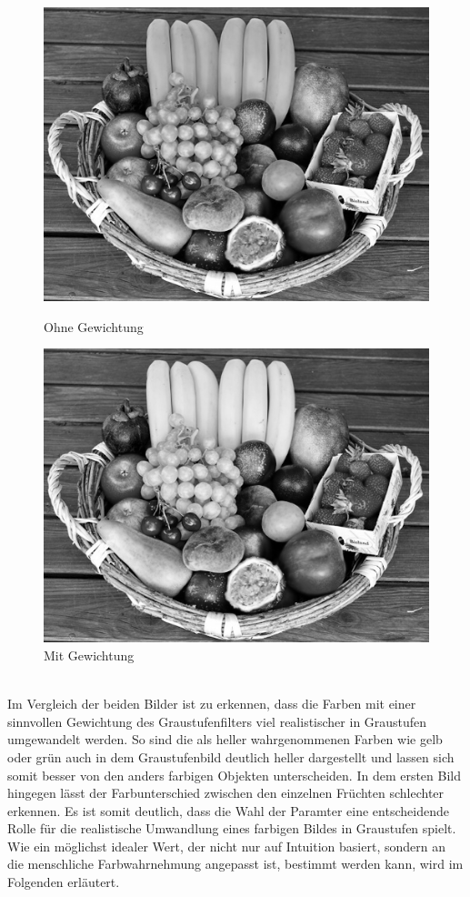 \documentclass[course=erap]{aspdoc}
\begin{document}
	\begin{figure}[h]
		\begin{minipage}{0.49\linewidth}
			\centering
			\includegraphics[scale=0.3]{Images/fruit_basket_grey_standard.png}
			\caption{Ohne Gewichtung}
		\end{minipage}
		\centering
		\begin{minipage}{0.49\linewidth}
			\centering
			\includegraphics[scale=0.3]{Images/fruit_basket_grey_improved.png}
			\caption{Mit Gewichtung}
		\end{minipage}
	\end{figure}\\

	\noindent Im Vergleich der beiden Bilder ist zu erkennen, dass die Farben mit einer sinnvollen Gewichtung des Graustufenfilters viel realistischer in Graustufen umgewandelt werden. So sind die als heller wahrgenommenen Farben wie gelb oder grün auch in dem Graustufenbild deutlich heller dargestellt und lassen sich somit besser von den anders farbigen Objekten unterscheiden. In dem ersten Bild hingegen lässt der Farbunterschied zwischen den einzelnen Früchten schlechter erkennen. Es ist somit deutlich, dass die Wahl der Paramter eine entscheidende Rolle für die realistische Umwandlung eines farbigen Bildes in Graustufen spielt. Wie ein möglichst idealer Wert, der nicht nur auf Intuition basiert, sondern an die menschliche Farbwahrnehmung angepasst ist, bestimmt werden kann, wird im Folgenden erläutert.
\end{document}
